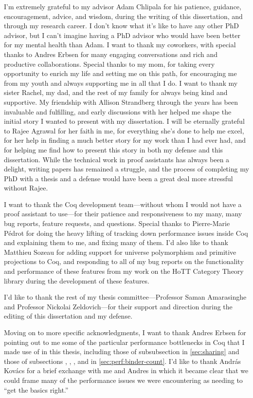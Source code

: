 I'm extremely grateful to my advisor Adam Chlipala for his patience, guidance, encouragement, advice, and wisdom, during the writing of this dissertation, and through my research career.
I don't know what it's like to have any other PhD advisor, but I can't imagine having a PhD advisor who would have been better for my mental health than Adam.
I want to thank my coworkers, with special thanks to Andres Erbsen for many engaging conversations and rich and productive collaborations.
Special thanks to my mom, for taking every opportunity to enrich my life and setting me on this path, for encouraging me from my youth and always supporting me in all that I do.
I want to thank my sister Rachel, my dad, and the rest of my family for always being kind and supportive.
My friendship with Allison Strandberg through the years has been invaluable and fulfilling, and early discussions with her helped me shape the initial story I wanted to present with my dissertation.
I will be eternally grateful to Rajee Agrawal for her faith in me, for everything she's done to help me excel, for her help in finding a much better story for my work than I had ever had, and for helping me find how to present this story in both my defense and this dissertation.
While the technical work in proof assistants has always been a delight, writing papers has remained a struggle, and the process of completing my PhD with a thesis and a defense would have been a great deal more stressful without Rajee.

I want to thank the Coq development team---without whom I would not have a proof assistant to use---for their patience and responsiveness to my many, many bug reports, feature requests, and questions.
Special thanks to Pierre-Marie Pédrot for doing the heavy lifting of tracking down performance issues inside Coq and explaining them to me, and fixing many of them.
I'd also like to thank Matthieu Sozeau for adding support for universe polymorphism and primitive projections to Coq, and responding to all of my bug reports on the functionality and performance of these features from my work on the HoTT Category Theory library during the development of these features.

I'd like to thank the rest of my thesis committee---Professor Saman Amarasinghe and Professor Nickolai Zeldovich---for their support and direction during the editing of this dissertation and my defense.

Moving on to more specific acknowledgments, I want to thank Andres Erbsen for pointing out to me some of the particular performance bottlenecks in Coq that I made use of in this thesis, including those of subsubsection  in \autoref{sec:sharing} and those of subsections , , , and  in \autoref{sec:perf:binder-count}.
I'd like to thank András Kovács for a brief exchange with me and Andres in which it became clear that we could frame many of the performance issues we were encountering as needing to ``get the basics right.''

